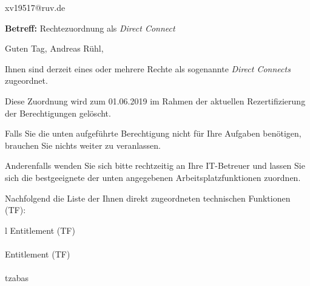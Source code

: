 \documentclass[a4paper,landscape,12pt]{letter}
\begin{document}
\begin{letter}{xv19517@ruv.de\hfill \break}
\begin{normalsize}
	\opening{\textbf{Betreff:} Rechtezuordnung als \emph{Direct Connect}}
	\begin{normalsize} \hfill
	\end{normalsize}

	\begin{normalsize}
		Guten Tag, 
	Andreas Rühl, \hfill \break
	\end{normalsize}
	\end{normalsize}
	
\begin{normalsize}
	Ihnen sind derzeit eines oder mehrere Rechte als sogenannte \emph{Direct Connects} zugeordnet.
	
	Diese Zuordnung wird zum 01.06.2019 im Rahmen der aktuellen Rezertifizierung der Berechtigungen gelöscht.
	
	Falls Sie die unten aufgeführte Berechtigung nicht für Ihre Aufgaben benötigen, 
	brauchen Sie nichts weiter zu veranlassen.
	
	Anderenfalls wenden Sie sich bitte rechtzeitig an Ihre IT-Betreuer 
	und lassen Sie sich die bestgeeignete der unten angegebenen Arbeitsplatzfunktionen zuordnen.
	\end{normalsize}
	
\begin{normalsize}
	Nachfolgend die Liste der Ihnen direkt zugeordneten technischen Funktionen (TF):

	\begin{longtable}{l}
		Entitlement (TF) \\ \hline
		\endfirsthead
		\\\hline
		Entitlement (TF) \\ \hline
		\endhead %
		\multicolumn{1}{r@{}}{Fortsetzung \ldots}\\
		\endfoot
		\hline
		\endlastfoot
	tzabas\\
	\end{longtable}
	\end{normalsize}
	

\end{letter}
\end{document}
